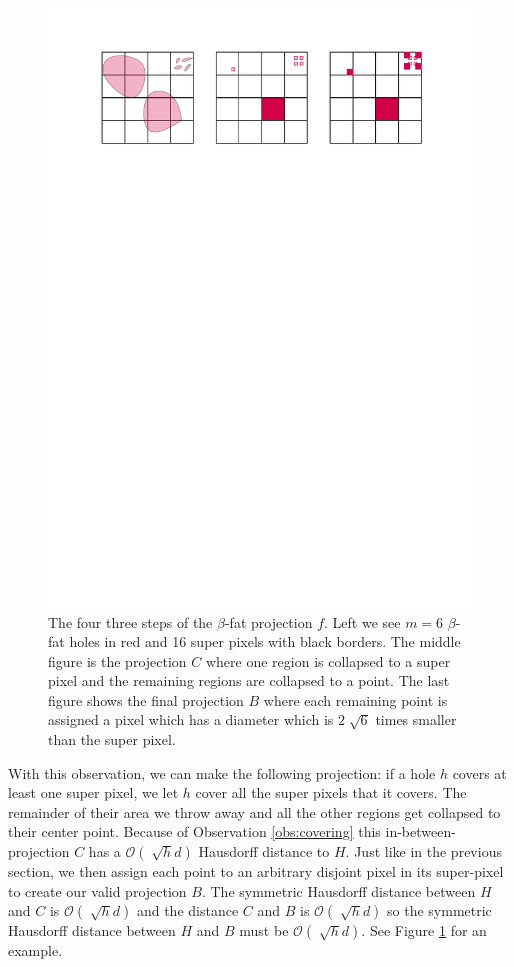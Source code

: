 \documentclass[a4paper,UKenglish,cleveref]{lipics-v2019}
\begin{document}
\begin{figure}[H]
\centering
\includegraphics[width=\textwidth]{Figures/fatprojection.pdf}
\caption{The four three steps of the $\beta$-fat projection $f$. Left we see $m=6$ $\beta$-fat holes in red and 16 super pixels with black borders. The middle figure is the projection $C$ where one region is collapsed to a super pixel and the remaining regions are collapsed to a point. The last figure shows the final projection $B$ where each remaining point is assigned a pixel which has a diameter which is $2\sqrt[]{6}$ times smaller than the super pixel. }
\label{fig:fatprojection}
\end{figure}


With this observation, we can make the following projection: if a hole $h$ covers at least one super pixel, we let $h$ cover all the super pixels that it covers. The remainder of their area we throw away and all the other regions get collapsed to their center point. Because of Observation \ref{obs:covering} this in-between-projection $C$ has a $\mathcal{O}(\sqrt[]{h}d)$ Hausdorff distance to $H$.
Just like in the previous section, we then assign each point to an arbitrary disjoint pixel in its super-pixel to create our valid projection $B$. The symmetric Hausdorff distance between $H$ and $C$ is $\mathcal{O}(\sqrt[]{h}d)$ and the distance $C$ and $B$ is $\mathcal{O}(\sqrt[]{h}d)$ so the symmetric Hausdorff distance between $H$ and $B$ must be $\mathcal{O}(\sqrt[]{h}d)$. See Figure \ref{fig:fatprojection} for an example.
\end{document}
